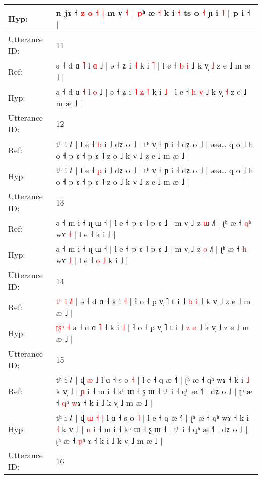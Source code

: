 \documentclass[10pt]{article}
\DeclareRobustCommand{\hl}[1]{{\textcolor{red}{#1}}}
\begin{document}
\begin{longtable}{ll}
Hyp: & n jɤ ˧\hl{}\hl{}\hl{}\hl{}\hl{} \hl{z} \hl{o} \hl{˧} \hl{|} m v̩ \hl{˧} | \hl{p}ʰ æ \hl{˧} k i \hl{˧} ts o \hl{˧} ɲ i\hl{}\hl{}\hl{}\hl{}\hl{}\hl{} \hl{˥} | p i ˧ |
 \\
\midrule
Utterance ID: & 11 \\
Ref: & ə ˧ d ɑ \hl{˥} l \hl{ɑ} ˩ | ə ˧ ʑ i\hl{}\hl{}\hl{}\hl{} \hl{˧} k i \hl{˥} | l e ˧ \hl{b} \hl{}\hl{i} ˩ k v̩ \hl{˩} z e ˩ m æ ˩ |
 \\
Hyp: & ə ˧ d ɑ \hl{˧} l \hl{o} ˩ | ə ˧ ʑ i\hl{ }\hl{˥}\hl{ }\hl{ʑ} \hl{˥} k i \hl{˩} | l e ˧ \hl{h} \hl{v}\hl{̩} ˩ k v̩ \hl{˧} z e ˩ m æ ˩ |
 \\
\midrule
Utterance ID: & 12 \\
Ref: & tʰ i ˩˥ | l e ˧ \hl{b} i ˩ dʑ o ˩ | tʰ v̩ ˧ ɲ i ˧ dʑ o ˩ | əəə… q o ˩ h o ˧ p ɤ ˧ p ɤ ˥ z o ˩ k v̩ ˩ z e ˩ m æ ˩ |
 \\
Hyp: & tʰ i ˩˥ | l e ˧ \hl{p} i ˩ dʑ o ˩ | tʰ v̩ ˧ ɲ i ˧ dʑ o ˩ | əəə… q o ˩ h o ˧ p ɤ ˧ p ɤ ˥ z o ˩ k v̩ ˩ z e ˩ m æ ˩ |
 \\
\midrule
Utterance ID: & 13 \\
Ref: & ə ˧ m i ˧ ɳ ɯ ˧ | l e ˧ p ɤ ˥ p ɤ ˩ | m v̩ ˩ z \hl{ɯ} ˩˥ | ʈʰ æ ˧ \hl{q}\hl{ʰ} wɤ \hl{˧} | l e ˧\hl{}\hl{}\hl{}\hl{} k i ˩ |
 \\
Hyp: & ə ˧ m i ˧ ɳ ɯ ˧ | l e ˧ p ɤ ˥ p ɤ ˩ | m v̩ ˩ z \hl{o} ˩˥ | ʈʰ æ ˧ \hl{}\hl{h} wɤ \hl{˩} | l e ˧\hl{ }\hl{o}\hl{ }\hl{˩} k i ˩ |
 \\
\midrule
Utterance ID: & 14 \\
Ref: & \hl{t}\hl{ʰ}\hl{ }\hl{i}\hl{ }\hl{˩}\hl{˥} \hl{|} ə ˧ d ɑ\hl{}\hl{} ˧ k i \hl{˧} | ɬ o ˧ p v̩ ˥ t i ˩ \hl{b} \hl{i} ˩ k v̩ ˩ z e ˩ m æ ˩ |
 \\
Hyp: & \hl{}\hl{}\hl{}\hl{}\hl{ʈ}\hl{ʂ}\hl{ʰ} \hl{˧} ə ˧ d ɑ\hl{ }\hl{˥} ˧ k i \hl{˩} | ɬ o ˧ p v̩ ˥ t i ˩ \hl{z} \hl{e} ˩ k v̩ ˩ z e ˩ m æ ˩ |
 \\
\midrule
Utterance ID: & 15 \\
Ref: & tʰ i ˩˥ | ɖ\hl{}\hl{} \hl{æ} \hl{˩} l ɑ ˧ s o \hl{˧} | l e ˧ q æ ˧˥ | ʈʰ æ ˧ qʰ wɤ ˧ k i \hl{˩} k v̩ ˩ | \hl{ɲ} i ˧ m i ˧ kʰ ɯ ˧ ʂ ɯ ˧\hl{}\hl{} tʰ i ˧ qʰ æ ˧˥ | dʑ o ˩ | ʈʰ æ ˧ \hl{q}ʰ \hl{w}ɤ ˧ k i ˩ k v̩ ˩ m æ ˩ |
 \\
Hyp: & tʰ i ˩˥ | ɖ\hl{ }\hl{ɯ} \hl{˧} \hl{|} l ɑ ˧ s o \hl{˥} | l e ˧ q æ ˧˥ | ʈʰ æ ˧ qʰ wɤ ˧ k i \hl{˧} k v̩ ˩ | \hl{n} i ˧ m i ˧ kʰ ɯ ˧ ʂ ɯ ˧\hl{ }\hl{|} tʰ i ˧ qʰ æ ˧˥ | dʑ o ˩ | ʈʰ æ ˧ \hl{p}ʰ \hl{}ɤ ˧ k i ˩ k v̩ ˩ m æ ˩ |
 \\
\midrule
Utterance ID: & 16 \\

\end{longtable}
\end{document}
